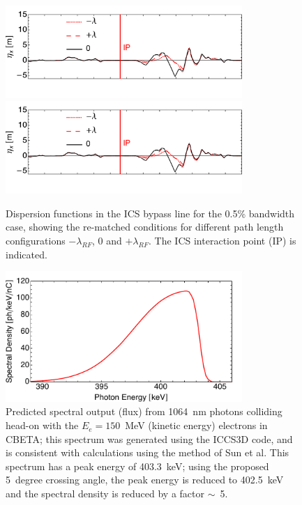 \documentclass[../main.tex]{subfiles}
\begin{document}
\begin{figure}[!htb]
\centering
\includegraphics[width=0.8\textwidth]{Figures/CBETA_Inverse_Compton_Source_Design/dispplotx.pdf}
\includegraphics[width=0.8\textwidth]{Figures/CBETA_Inverse_Compton_Source_Design/dispplotx.pdf}
\caption{Dispersion functions in the ICS bypass line for the 0.5\% bandwidth case, showing the re-matched conditions for different path length configurations $-\lambda_{RF}$, $0$ and $+\lambda_{RF}$. The ICS interaction point (IP) is indicated.}
\label{fig:CBETA_ICS_dispersion}
\end{figure}

\begin{figure}[!htb]
\centering
\includegraphics[width=0.8\textwidth]{Figures/CBETA_Inverse_Compton_Source_Design/cbetaspectrumplot.pdf}
\caption{Predicted spectral output (flux) from 1064~nm photons colliding head-on with the $E_e =150$~MeV (kinetic energy) electrons in CBETA; this spectrum was generated using the \textsc{ICCS3D} code, and is consistent with calculations using the method of Sun et al. This spectrum has a peak energy of 403.3~keV; using the proposed 5~degree crossing angle, the peak energy is reduced to 402.5~keV and the spectral density is reduced by a factor $\sim$~5.}
\label{fig:CBETA_ICS_Spectra}
\end{figure}
\end{document}
